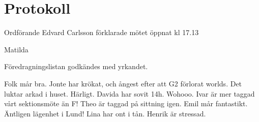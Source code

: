 \documentclass[10pt]{article}
\def\mo{Edvard Carlsson}
\begin{document}
\section*{Protokoll}
\begin{paragrafer}
Ordförande {\mo} förklarade mötet öppnat kl 17.13

{\valavmo}

{\valavms}

{\valavj}

{\tosg}

Matilda





Föredragningslistan godkändes med yrkandet.

\textit{\ingaprot}

\begin{fyllnadsval} %


\end{fyllnadsval}

\begin{paragrafer}
Folk mår bra. Jonte har krökat, och ångest efter att G2 förlorat worlds. 
Det luktar arkad i huset. Härligt. 
Davida har sovit 14h. Wohooo. 
Ivar är mer taggad vårt sektionsmöte än F!
Theo är taggad på sittning igen. 
Emil mår fantastikt. Äntligen lägenhet i Lund!
Lina har ont i tån. Henrik är stressad. 


\end{paragrafer}
\end{paragrafer}
\end{document}
